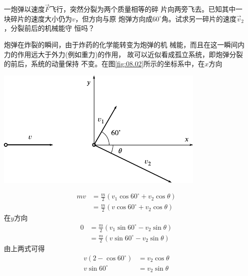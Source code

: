 \example 一炮弹以速度$ \vec { F } $飞行，突然分裂为两个质量相等的碎
片向两旁飞去。已知其中一块碎片的速度大小仍为$ v $，但方向与原
炮弹方向成$ 60 ^ { \circ } $角。试求另一碎片的速度$ \vec { v } _ { 2 } $，分裂前后的机械能守
恒吗？

\resolve 炮弹在炸裂的瞬间，由于炸药的化学能转变为炮弹的机
械能，而且在这一瞬间内力的作用远大于外力(例如重力)的作用，
故可以近似看成孤立系统，即炮弹分裂的前后，系统的动量保持
不变。在图\ref{fig:08.02}所示的坐标系中，在$ x $方向
\begin{figurex}
  \centering
  \includegraphics{figure/fig08.02}
  \caption{}
  \label{fig:08.02}
\end{figurex}
\begin{equation*}
  \begin{split}
    m v &= \frac { m } { 2 } \left( v _ { 1 } \cos 60 ^ { \circ } + v _ { 2 } \cos \theta \right)  \\
    &= \frac { m } { 2 } \left( v \cos 60 ^ { \circ } + v _ { 2 } \cos \theta \right)
  \end{split}
\end{equation*}
在$ y $方向
\begin{equation*}
  \begin{split}
    0 &= \frac { m } { 2 } \left( v _ { 1 } \sin 60 ^ { \circ } - v _ { 2 } \sin \theta \right)  \\
    &= \frac { m } { 2 } \left( v \sin 60 ^ { \circ } - v _ { 2 } \sin \theta \right)
  \end{split}
\end{equation*}
由上两式可得
\begin{equation*}
  \begin{split}
    v \left( 2 - \cos 60 ^ { \circ } \right) &= v _ { 2 } \cos \theta  \\
    v \sin 60 ^ { \circ } &= v _ { 2 } \sin \theta
  \end{split}
\end{equation*}
